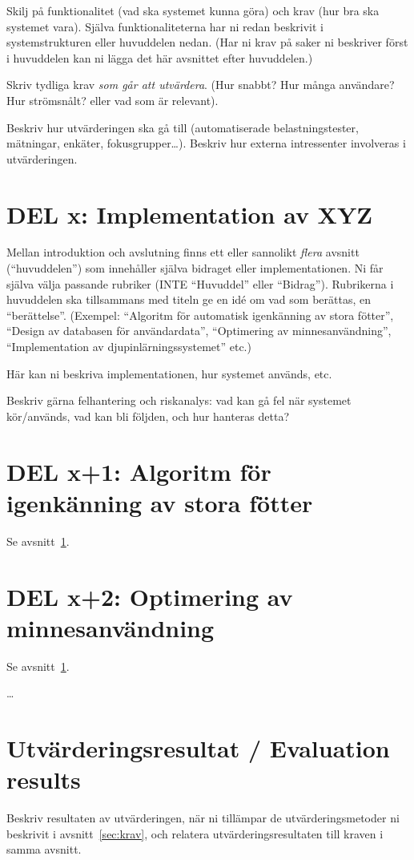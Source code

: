 \documentclass[a4paper,12pt]{article}
\begin{document}
Skilj på funktionalitet (vad ska systemet kunna göra) och krav (hur bra ska systemet vara). Själva funktionaliteterna har ni redan beskrivit i systemstrukturen eller huvuddelen nedan. (Har ni krav på saker ni beskriver först i huvuddelen kan ni lägga det här avsnittet efter huvuddelen.)

Skriv tydliga krav \emph{som går att utvärdera}.  (Hur snabbt? Hur många användare? Hur strömsnålt? eller vad som är relevant).

Beskriv hur utvärderingen ska gå till (automatiserade belastningstester, mätningar, en\-käter, fokusgrupper\ldots).
Beskriv hur externa intressenter involveras i utvärderingen.

\section{DEL x: Implementation av XYZ}\label{sec:delX}
Mellan introduktion och avslutning finns ett eller sannolikt \emph{flera} avsnitt (``huvuddelen'') som innehåller själva bidraget eller implementationen.
Ni får själva välja passande rubriker (INTE ``Huvuddel'' eller ``Bidrag'').  Rubrikerna i huvuddelen ska tillsammans med titeln ge en idé om vad som berättas, en ``berättelse''. (Exempel: ``Algoritm för automatisk igenkänning av stora fötter'', ``Design av databasen för användardata'', ``Optimering av minnesanvändning'', ``Implementation av djupinlärningssystemet'' etc.)

Här kan ni beskriva implementationen, hur systemet används, etc.

Beskriv gärna felhantering och riskanalys: vad kan gå fel när systemet kör/används, vad kan bli följden, och hur hanteras detta?

\section{DEL x+1: Algoritm för igenkänning av stora fötter}
Se avsnitt~\ref{sec:delX}.
\section{DEL x+2: Optimering av minnesanvändning}
Se avsnitt~\ref{sec:delX}.

\ldots

\section{Utvärderingsresultat / Evaluation results}
Beskriv resultaten av utvärderingen, när ni tillämpar de utvärderingsmetoder ni beskrivit i avsnitt~\ref{sec:krav}, och relatera utvärderingsresultaten till kraven i samma avsnitt.
\end{document}
